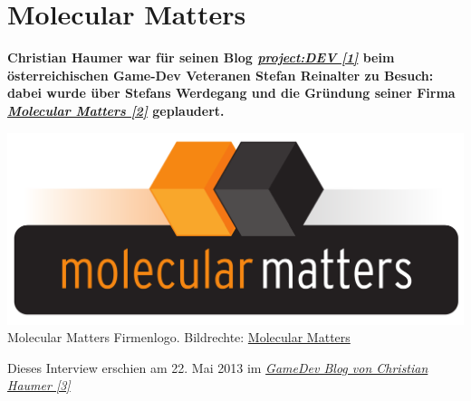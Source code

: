\section*{Molecular Matters}
\hypertarget{molecularmatters}{}
\label{molecularmatters}

\textbf{Christian Haumer  war für seinen Blog \href{http://projectdev.humepage.at/}{\textit{project:DEV [1]}} beim österreichischen Game-Dev Veteranen Stefan Reinalter zu Besuch: dabei wurde über Stefans Werdegang und die Gründung seiner Firma \href{http://www.molecular-matters.com/company/company.html}{\textit{Molecular Matters [2]}} geplaudert.} 
\begin{center}
\includegraphics[width=\linewidth]{molecularmatters/molecularmatters.png} 
\footnotesize{Molecular Matters Firmenlogo. Bildrechte: \href{http://www.molecular-matters.com}{Molecular Matters}} \\
\end{center}

Dieses Interview erschien am 22. Mai 2013 im \href{http://projectdev.humepage.at/1419}{\textit{GameDev Blog von Christian Haumer [3]}}

